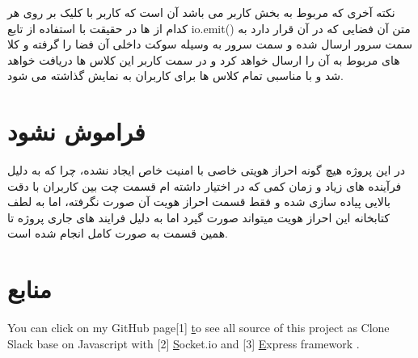 \documentclass{article}
\begin{document}
نکته آخری که مربوط به بخش کاربر می باشد آن است که کاربر با کلیک بر روی هر کدام از
ها در حقیقت با استفاده از تابع 
io.emit()
متن آن فضایی که در آن قرار دارد به سمت سرور ارسال شده و سمت سرور به وسیله سوکت
داخلی آن فضا را گرفته و کلا های مربوط به آن را ارسال خواهد کرد و در سمت 
کاربر این کلاس ها دریافت خواهد شد و با 
مناسبی تمام کلاس ها برای کاربران به نمایش گذاشته می شود.


\section{فراموش نشود}
در این پروژه هیچ گونه احراز هویتی خاصی با امنیت خاص ایجاد نشده، چرا که 
به دلیل فرآینده های زیاد و زمان کمی که در اختیار داشته ام قسمت چت بین کاربران
با دقت بالایی پیاده سازی شده و فقط قسمت احراز هویت آن صورت نگرفته، اما به لطف کتابخانه
این احراز هویت میتواند صورت گیرد اما به دلیل فرایند های جاری پروژه تا همین قسمت به صورت
کامل انجام شده است.




\newpage
\section*{منابع}

\medskip

\small
\LTR 
\latin


You can click on my GitHub page[1] \href{https://github.com/Asncodes-80/handouting_hws/tree/main/specialCourse/project/slack} to see all source of this project as 
Clone Slack base on Javascript with [2] \href{https://socket.io/} Socket.io 
and [3] \href{http://expressjs.com/}Express framework .
\end{document}
